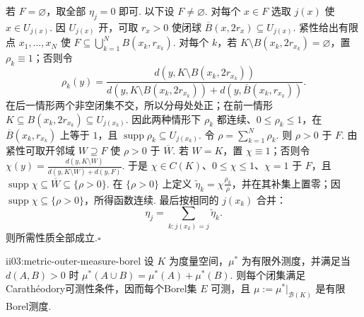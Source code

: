 \begin{FAProof}
若 \(\displaystyle F=\varnothing\)，取全部 \(\displaystyle\eta_j=0\) 即可. 以下设 \(\displaystyle F\neq\varnothing\). 对每个 \(\displaystyle x\in F\) 选取 \(\displaystyle j(x)\) 使 \(\displaystyle x\in U_{j(x)}\). 因 \(\displaystyle U_{j(x)}\) 开，可取 \(\displaystyle r_x>0\) 使闭球 \(\displaystyle\overline B(x,2r_x)\subseteq U_{j(x)}\). 紧性给出有限点 \(\displaystyle x_1,\dots,x_N\) 使 \(\displaystyle F\subseteq\bigcup_{k=1}^N B(x_k,r_{x_k})\). 对每个 \(\displaystyle k\)，若 \(\displaystyle K\setminus B(x_k,2r_{x_k})=\varnothing\)，置 \(\displaystyle\rho_k\equiv1\)；否则令
\[
\rho_k(y)=\frac{d(y,K\setminus B(x_k,2r_{x_k}))}{d(y,K\setminus B(x_k,2r_{x_k}))+d(y,\overline B(x_k,r_{x_k}))}.
\]
在后一情形两个非空闭集不交，所以分母处处正；在前一情形 \(\displaystyle K\subseteq B(x_k,2r_{x_k})\subseteq U_{j(x_k)}\). 因此两种情形下 \(\displaystyle\rho_k\) 都连续、\(\displaystyle0\leqslant\rho_k\leqslant1\)，在 \(\displaystyle\overline B(x_k,r_{x_k})\) 上等于 \(\displaystyle1\)，且 \(\displaystyle\operatorname{supp}\rho_k\subseteq U_{j(x_k)}\). 令 \(\displaystyle\rho=\sum_{k=1}^N\rho_k\). 则 \(\displaystyle\rho>0\) 于 \(\displaystyle F\). 由紧性可取开邻域 \(\displaystyle W\supseteq F\) 使 \(\displaystyle\rho>0\) 于 \(\displaystyle\overline W\). 若 \(\displaystyle W=K\)，置 \(\displaystyle\chi\equiv1\)；否则令
\(\displaystyle \chi(y)=\frac{d(y,K\setminus W)}{d(y,K\setminus W)+d(y,F)}.\)
于是 \(\displaystyle\chi\in C(K)\)、\(\displaystyle0\leqslant\chi\leqslant1\)、\(\displaystyle\chi=1\) 于 \(\displaystyle F\)，且 \(\displaystyle\operatorname{supp}\chi\subseteq\overline W\subseteq\{\rho>0\}\). 在 \(\displaystyle\{\rho>0\}\) 上定义 \(\displaystyle\widetilde\eta_k=\chi\frac{\rho_k}{\rho}\)，并在其补集上置零；因 \(\displaystyle\operatorname{supp}\chi\subseteq\{\rho>0\}\)，所得函数连续. 最后按相同的 \(\displaystyle j(x_k)\) 合并：
\[
\eta_j=\sum_{k:j(x_k)=j}\widetilde\eta_k.
\]
则所需性质全部成立.\hfill\(\square\)
\end{FAProof}

\begin{FALemma}[C][有限度量外测度的Borel可测性]{ii03:metric-outer-measure-borel}
设 \(\displaystyle K\) 为度量空间，\(\displaystyle\mu^*\) 为有限外测度，并满足当 \(\displaystyle d(A,B)>0\) 时
\(\displaystyle \mu^*(A\cup B)=\mu^*(A)+\mu^*(B).\)
则每个闭集满足Carath\'eodory可测性条件，因而每个Borel集 \(\displaystyle E\) 可测，且 \(\displaystyle\mu:=\mu^*|_{\mathcal B(K)}\) 是有限Borel测度.
\end{FALemma}

